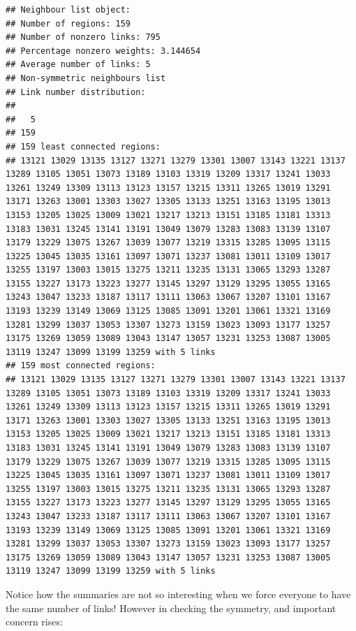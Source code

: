 \documentclass[
]{book}
\begin{document}
\begin{verbatim}
## Neighbour list object:
## Number of regions: 159 
## Number of nonzero links: 795 
## Percentage nonzero weights: 3.144654 
## Average number of links: 5 
## Non-symmetric neighbours list
## Link number distribution:
## 
##   5 
## 159 
## 159 least connected regions:
## 13121 13029 13135 13127 13271 13279 13301 13007 13143 13221 13137 13289 13105 13051 13073 13189 13103 13319 13209 13317 13241 13033 13261 13249 13309 13113 13123 13157 13215 13311 13265 13019 13291 13171 13263 13001 13303 13027 13305 13133 13251 13163 13195 13013 13153 13205 13025 13009 13021 13217 13213 13151 13185 13181 13313 13183 13031 13245 13141 13191 13049 13079 13283 13083 13139 13107 13179 13229 13075 13267 13039 13077 13219 13315 13285 13095 13115 13225 13045 13035 13161 13097 13071 13237 13081 13011 13109 13017 13255 13197 13003 13015 13275 13211 13235 13131 13065 13293 13287 13155 13227 13173 13223 13277 13145 13297 13129 13295 13055 13165 13243 13047 13233 13187 13117 13111 13063 13067 13207 13101 13167 13193 13239 13149 13069 13125 13085 13091 13201 13061 13321 13169 13281 13299 13037 13053 13307 13273 13159 13023 13093 13177 13257 13175 13269 13059 13089 13043 13147 13057 13231 13253 13087 13005 13119 13247 13099 13199 13259 with 5 links
## 159 most connected regions:
## 13121 13029 13135 13127 13271 13279 13301 13007 13143 13221 13137 13289 13105 13051 13073 13189 13103 13319 13209 13317 13241 13033 13261 13249 13309 13113 13123 13157 13215 13311 13265 13019 13291 13171 13263 13001 13303 13027 13305 13133 13251 13163 13195 13013 13153 13205 13025 13009 13021 13217 13213 13151 13185 13181 13313 13183 13031 13245 13141 13191 13049 13079 13283 13083 13139 13107 13179 13229 13075 13267 13039 13077 13219 13315 13285 13095 13115 13225 13045 13035 13161 13097 13071 13237 13081 13011 13109 13017 13255 13197 13003 13015 13275 13211 13235 13131 13065 13293 13287 13155 13227 13173 13223 13277 13145 13297 13129 13295 13055 13165 13243 13047 13233 13187 13117 13111 13063 13067 13207 13101 13167 13193 13239 13149 13069 13125 13085 13091 13201 13061 13321 13169 13281 13299 13037 13053 13307 13273 13159 13023 13093 13177 13257 13175 13269 13059 13089 13043 13147 13057 13231 13253 13087 13005 13119 13247 13099 13199 13259 with 5 links
\end{verbatim}

Notice how the summaries are not so interesting when we force everyone to have the same number of links! However in checking the symmetry, and important concern rises:
\end{document}
